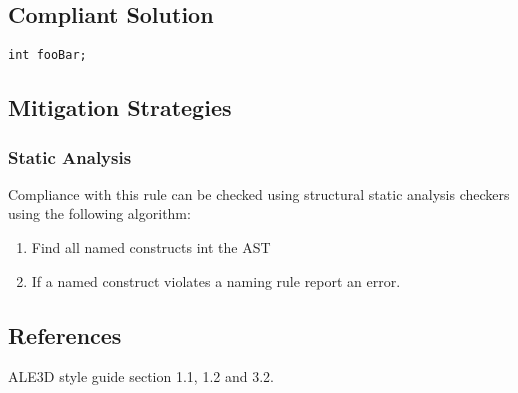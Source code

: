 \subsection{Compliant Solution}

\begin{verbatim}
int fooBar;
\end{verbatim}

\subsection{Mitigation Strategies}
\subsubsection{Static Analysis} 

Compliance with this rule can be checked using structural static analysis checkers using the following algorithm:

\begin{enumerate}
\item Find all named constructs int the AST
\item If a named construct violates a naming rule report an error.
\end{enumerate}

\subsection{References}

ALE3D style guide section 1.1, 1.2 and 3.2.
